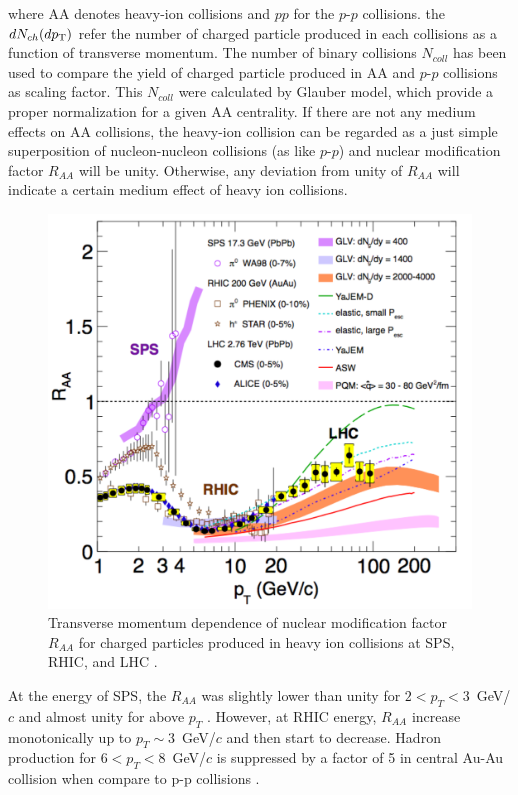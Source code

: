 where AA denotes heavy-ion collisions and $pp$ for the $p$-$p$ collisions. the $dN_{ch}(dp_{\rm{T}})$ refer the number of charged particle produced in each collisions as a function of transverse momentum. The number of binary collisions $N_{coll}$ has been used to compare the yield of charged particle produced in AA and $p$-$p$ collisions as scaling factor. This $N_{coll}$ were calculated by Glauber model, which provide a proper normalization for a given AA centrality. 
  If there are not any medium effects on AA collisions, the heavy-ion collision can be regarded as a just simple superposition of nucleon-nucleon collisions (as like $p$-$p$) and nuclear modification factor $R_{AA}$ will be unity. Otherwise, any deviation from unity of $R_{AA}$  will indicate a certain medium effect of heavy ion collisions. 
  

\begin{figure}[!t]
\centerline{\includegraphics[width=12.0cm]{figures/raa}}
\caption{ Transverse momentum dependence of nuclear modification factor $R_{AA}$ for charged particles produced in heavy ion collisions at SPS, RHIC, and LHC \cite{Roland201470}.} 
\label{fig:RAA}
\end{figure}

    At the energy of SPS, the $R_{AA}$ was slightly lower than unity for $2 < p_T < 3$~GeV/$c$ and almost unity for above $p_T$ \cite{Aggarwaletal.2002}.   However, at RHIC energy, $R_{AA}$ increase monotonically up to $p_T \sim 3$~GeV/$c$ and then start to decrease. Hadron production for $6 < p_T < 8$~GeV/$c$ is suppressed by a factor of 5 in central Au-Au collision when compare to p-p collisions \cite{PhysRevLett.101.232301, PhysRevLett.91.172302}.
    
